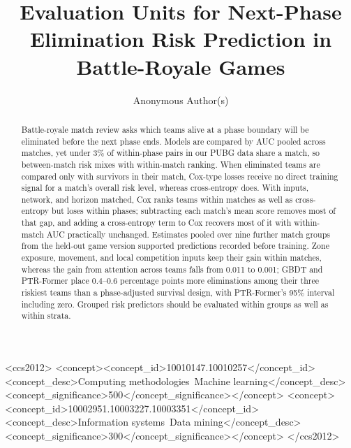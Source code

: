 \documentclass[sigconf,anonymous]{acmart}
\begin{document}
\title{Evaluation Units for Next-Phase Elimination Risk Prediction in Battle-Royale Games}
\renewcommand{\shorttitle}{Evaluation Units for Next-Phase Elimination Prediction}

\author{Anonymous Author(s)}

\begin{abstract}
Battle-royale match review asks which teams alive at a phase boundary will be eliminated before the next phase ends. Models are compared by AUC pooled across matches, yet under 3\% of within-phase pairs in our PUBG data share a match, so between-match risk mixes with within-match ranking. When eliminated teams are compared only with survivors in their match, Cox-type losses receive no direct training signal for a match's overall risk level, whereas cross-entropy does. With inputs, network, and horizon matched, Cox ranks teams within matches as well as cross-entropy but loses within phases; subtracting each match's mean score removes most of that gap, and adding a cross-entropy term to Cox recovers most of it with within-match AUC practically unchanged. Estimates pooled over nine further match groups from the held-out game version supported predictions recorded before training. Zone exposure, movement, and local competition inputs keep their gain within matches, whereas the gain from attention across teams falls from 0.011 to 0.001; GBDT and PTR-Former place 0.4--0.6 percentage points more eliminations among their three riskiest teams than a phase-adjusted survival design, with PTR-Former's 95\% interval including zero. Grouped risk predictors should be evaluated within groups as well as within strata.
\end{abstract}
\begin{CCSXML}
<ccs2012>
<concept><concept_id>10010147.10010257</concept_id><concept_desc>Computing methodologies~Machine learning</concept_desc><concept_significance>500</concept_significance></concept>
<concept><concept_id>10002951.10003227.10003351</concept_id><concept_desc>Information systems~Data mining</concept_desc><concept_significance>300</concept_significance></concept>
</ccs2012>
\end{CCSXML}
\maketitle
\end{document}
